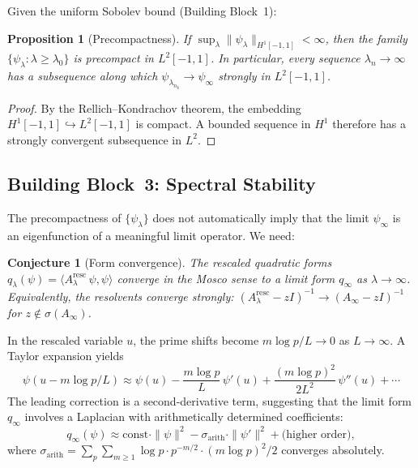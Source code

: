 \documentclass[12pt,a4paper]{article}
\newtheorem{proposition}[theorem]{Proposition}
\newtheorem{conjecture}[theorem]{Conjecture}
\theoremstyle{definition}
\theoremstyle{remark}
\begin{document}
Given the uniform Sobolev bound (Building Block~1):

\begin{proposition}[Precompactness]
\label{prop:precompact}
If $\sup_\lambda \|\psi_\lambda\|_{H^1[-1,1]} < \infty$, then the family $\{\psi_\lambda : \lambda \geq \lambda_0\}$ is precompact in $L^2[-1,1]$. In particular, every sequence $\lambda_n \to \infty$ has a subsequence along which $\psi_{\lambda_{n_k}} \to \psi_\infty$ strongly in $L^2[-1,1]$.
\end{proposition}

\begin{proof}
By the Rellich--Kondrachov theorem, the embedding $H^1[-1,1] \hookrightarrow L^2[-1,1]$ is compact. A bounded sequence in $H^1$ therefore has a strongly convergent subsequence in $L^2$.
\end{proof}

\subsection{Building Block~3: Spectral Stability}

The precompactness of $\{\psi_\lambda\}$ does not automatically imply that the limit $\psi_\infty$ is an eigenfunction of a meaningful limit operator. We need:

\begin{conjecture}[Form convergence]
\label{conj:mosco}
The rescaled quadratic forms $q_\lambda(\psi) = \langle A_\lambda^{\mathrm{resc}}\,\psi, \psi\rangle$ converge in the Mosco sense to a limit form $q_\infty$ as $\lambda \to \infty$. Equivalently, the resolvents converge strongly:
$(A_\lambda^{\mathrm{resc}} - zI)^{-1} \to (A_\infty - zI)^{-1}$ for $z \notin \sigma(A_\infty)$.
\end{conjecture}

In the rescaled variable $u$, the prime shifts become $m\log p / L \to 0$ as $L \to \infty$. A Taylor expansion yields
\[
  \psi(u - m\log p / L) \approx \psi(u) - \frac{m\log p}{L}\,\psi'(u) + \frac{(m\log p)^2}{2L^2}\,\psi''(u) + \cdots
\]
The leading correction is a second-derivative term, suggesting that the limit form $q_\infty$ involves a Laplacian with arithmetically determined coefficients:
\begin{equation}
\label{eq:limit-form}
q_\infty(\psi) \approx \mathrm{const} \cdot \|\psi\|^2 - \sigma_{\mathrm{arith}} \cdot \|\psi'\|^2 + \text{(higher order)},
\end{equation}
where $\sigma_{\mathrm{arith}} = \sum_p \sum_{m \geq 1} \log p \cdot p^{-m/2} \cdot (m\log p)^2 / 2$ converges absolutely.
\end{document}
